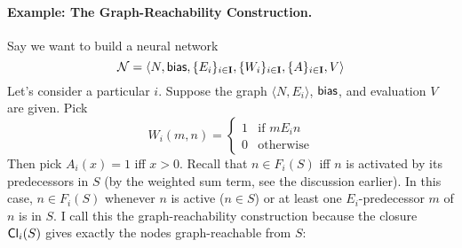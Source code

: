 \documentclass[letterpaper]{article}
\begin{document}
\paragraph*{Example: The Graph-Reachability Construction.}
    Say we want to build a neural network 
    \[\mathcal{N} = \langle N, \mathsf{bias}, \{ E_i \}_{i \in \textbf{I}}, \{ W_i \}_{i \in \textbf{I}}, \{ A \}_{i \in \textbf{I}}, V \rangle\]
    Let's consider a particular $i$. Suppose the graph $\langle N, E_i \rangle$, $\mathsf{bias}$, and evaluation $V$ are given.  Pick 
    \[
        W_i(m, n) = 
        \begin{cases}
            1 & \mbox{if } m{E_i}n \\
            0 & \mbox{otherwise}
        \end{cases}
    \]
    Then pick $A_i(x) = 1$ iff $x > 0$. Recall that $n \in F_i(S)$ iff $n$ is activated by its predecessors in $S$ (by the weighted sum term, see the discussion earlier).  In this case, $n \in F_i(S)$ whenever $n$ is active ($n \in S$) or at least one $E_i$-predecessor $m$ of $n$ is in $S$.  I call this the graph-reachability construction because the closure $\mathsf{Cl}_i(S)$ gives exactly the nodes graph-reachable from $S$:
\end{document}
